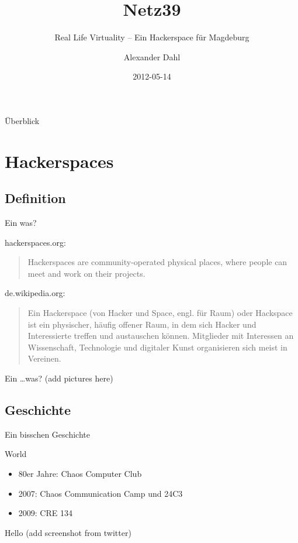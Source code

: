 \documentclass[hyperref={pdfpagelabels=false}]{beamer}
\title[Netz39]{Netz39}
\subtitle{Real Life Virtuality -- Ein Hackerspace für Magdeburg}
\author{Alexander Dahl}
\institute[netz39.de]{\url{http://www.netz39.de/}}
\date{2012-05-14}
\begin{document}
\begin{frame}
	\titlepage
\end{frame}

\begin{frame}{Überblick}
    \tableofcontents
\end{frame}

\section{Hackerspaces}

\subsection{Definition}

\begin{frame}{Ein was?}
    \begin{block}{hackerspaces.org:}
        \begin{quote}
            Hackerspaces are community-operated physical places, where people
            can meet and work on their projects.
        \end{quote}
    \end{block}
    \pause
    \begin{block}{de.wikipedia.org:}
        \begin{quote}
            Ein Hackerspace (von Hacker und Space, engl. für Raum) oder
            Hackspace ist ein physischer, häufig offener Raum, in dem sich
            Hacker und Interessierte treffen und austauschen können.
            Mitglieder mit Interessen an Wissenschaft, Technologie und
            digitaler Kunst organisieren sich meist in Vereinen.
        \end{quote}
    \end{block}
\end{frame}

\begin{frame}{Ein \dots was?}
    (add pictures here)
\end{frame}

\subsection{Geschichte}

\begin{frame}{Ein bisschen Geschichte}
    \begin{block}{World}
        \begin{itemize}
            \item 80er Jahre: Chaos Computer Club
            \item 2007: Chaos Communication Camp und 24C3
                \cite{Ohlig2007}
            \item 2009: CRE 134 \cite{Pritlove2009}
        \end{itemize}
    \end{block}
    \pause
    \begin{block}{Hello}
        (add screenshot from twitter)
    \end{block}
\end{frame}
\end{document}
